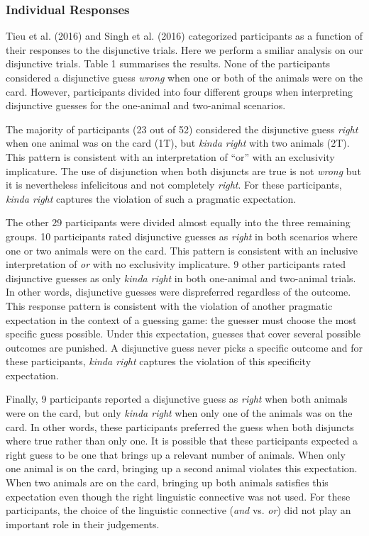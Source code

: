 \documentclass[10pt, letterpaper]{article}
\begin{document}
\subsubsection{Individual Responses}\label{individual-responses}

Tieu et al. (2016) and Singh et al. (2016) categorized participants as a
function of their responses to the disjunctive trials. Here we perform a
smiliar analysis on our disjunctive trials. Table 1 summarises the
results. None of the participants considered a disjunctive guess
\emph{wrong} when one or both of the animals were on the card. However,
participants divided into four different groups when interpreting
disjunctive guesses for the one-animal and two-animal scenarios.

The majority of participants (23 out of 52) considered the disjunctive
guess \emph{right} when one animal was on the card (1T), but \emph{kinda
right} with two animals (2T). This pattern is consistent with an
interpretation of ``or'' with an exclusivity implicature. The use of
disjunction when both disjuncts are true is not \emph{wrong} but it is
nevertheless infelicitous and not completely \emph{right}. For these
participants, \emph{kinda right} captures the violation of such a
pragmatic expectation.

The other 29 participants were divided almost equally into the three
remaining groups. 10 participants rated disjunctive guesses as
\emph{right} in both scenarios where one or two animals were on the
card. This pattern is consistent with an inclusive interpretation of
\emph{or} with no exclusivity implicature. 9 other participants rated
disjunctive guesses as only \emph{kinda right} in both one-animal and
two-animal trials. In other words, disjunctive guesses were dispreferred
regardless of the outcome. This response pattern is consistent with the
violation of another pragmatic expectation in the context of a guessing
game: the guesser must choose the most specific guess possible. Under
this expectation, guesses that cover several possible outcomes are
punished. A disjunctive guess never picks a specific outcome and for
these participants, \emph{kinda right} captures the violation of this
specificity expectation.

Finally, 9 participants reported a disjunctive guess as \emph{right}
when both animals were on the card, but only \emph{kinda right} when
only one of the animals was on the card. In other words, these
participants preferred the guess when both disjuncts where true rather
than only one. It is possible that these participants expected a right
guess to be one that brings up a relevant number of animals. When only
one animal is on the card, bringing up a second animal violates this
expectation. When two animals are on the card, bringing up both animals
satisfies this expectation even though the right linguistic connective
was not used. For these participants, the choice of the linguistic
connective (\emph{and} vs. \emph{or}) did not play an important role in
their judgements.
\end{document}
